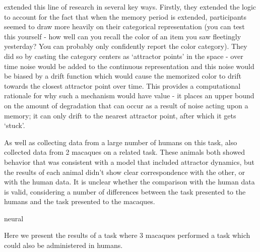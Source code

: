 \cite{panichello_error-correcting_2019} extended this line of research in several key ways. 
Firstly, they extended the logic to account for the fact that when the memory period is extended, participants seemed to draw more heavily on their categorical representation (you can test this yourself - how well can you recall the color of an item you saw fleetingly yesterday? 
You can probably only confidently report the color category). 
They did so by casting the category centers as `attractor points' in the space - over time noise would be added to the continuous representation and this noise would be biased by a drift function which would cause the memorized color to drift towards the closest attractor point over time. 
This provides a computational rationale for why such a mechanism would have value - it places an upper bound on the amount of degradation that can occur as a result of noise acting upon a memory; it can only drift to the nearest attractor point, after which it gets `stuck'.

As well as collecting data from a large number of humans on this task, \cite{panichello_error-correcting_2019} also collected data from 2 macaques on a related task. 
These animals both showed behavior that was consistent with a model that included attractor dynamics, but the results of each animal didn't show clear correspondence with the other, or with the human data.
It is unclear whether the comparison with the human data is valid, considering a number of differences between the task presented to the humans and the task presented to the macaques.

neural

Here we present the results of a task where 3 macaques performed a task which could also be administered in humans.

